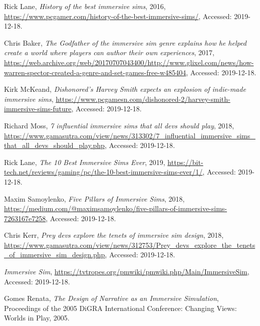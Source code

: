 \documentclass[a4paper]{article}
\begin{document}
\renewcommand{\refname}{\section{References and Further Sources}}
\begin{thebibliography}{1}

Rick Lane,
  \emph{History of the best immersive sims}, 2016,
  {\url{https://www.pcgamer.com/history-of-the-best-immersive-sims/}},
  {Accessed: 2019-12-18}.
  
Chris Baker,
  \emph{The Godfather of the immersive sim genre explains how he helped create a world where players can author their own experiences}, 2017,
  {\url{https://web.archive.org/web/20170707043400/http://www.glixel.com/news/how-warren-spector-created-a-genre-and-set-games-free-w485404}},
  {Accessed: 2019-12-18}.
  
  
Kirk McKeand,
  \emph{Dishonored’s Harvey Smith expects an explosion of indie-made immersive sims},
  {\url{  https://www.pcgamesn.com/dishonored-2/harvey-smith-immersive-sims-future}},
  {Accessed: 2019-12-18}.
  
   Richard Moss,
  \emph{7 influential immersive sims that all devs should play}, 2018,
  {\url{  https://www.gamasutra.com/view/news/313302/7_influential_immersive_sims_that_all_devs_should_play.php}},
  {Accessed: 2019-12-18}.
  
  
   Rick Lane,
  \emph{The 10 Best Immersive Sims Ever}, 2019,
  {\url{ https://bit-tech.net/reviews/gaming/pc/the-10-best-immersive-sims-ever/1/}},
  {Accessed: 2019-12-18}.
  
   Maxim Samoylenko,
  \emph{Five Pillars of Immersive Sims}, 2018,
  {\url{https://medium.com/@maximsamoylenko/five-pillars-of-immersive-sims-7263167e7258}},
  {Accessed: 2019-12-18}.
  
  Chris Kerr,
  \emph{Prey devs explore the tenets of immersive sim design}, 2018,
  {\url{https://www.gamasutra.com/view/news/312753/Prey_devs_explore_the_tenets_of_immersive_sim_design.php}},
  {Accessed: 2019-12-18}.
  
  \emph{Immersive Sim},
  {\url{https://tvtropes.org/pmwiki/pmwiki.php/Main/ImmersiveSim}},
  {Accessed: 2019-12-18}.
  
{Gomes Renata},
\emph{The Design of Narrative as an Immersive Simulation},
{Proceedings of the 2005 DiGRA International Conference: Changing Views: Worlds in Play},
{2005}.



\end{thebibliography}
\end{document}

